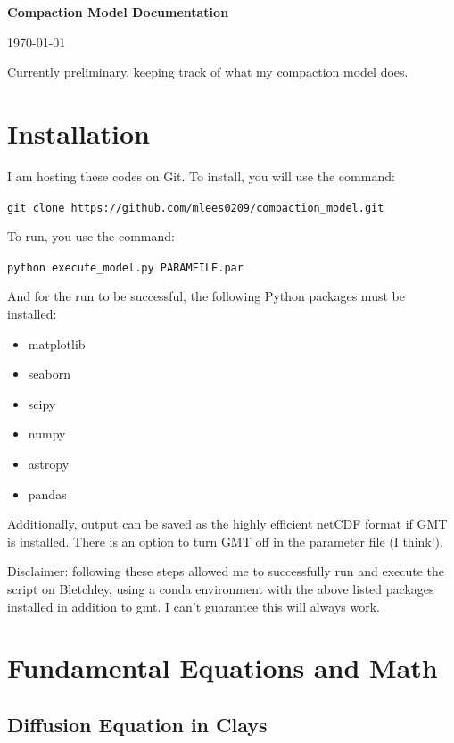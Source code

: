 \documentclass{article}
\begin{document}
\LARGE\textbf{Compaction Model Documentation}
\normalsize

\today
\author{Matt Lees}

\abstract Currently preliminary, keeping track of what my compaction model does.


\tableofcontents

\section{Installation}

I am hosting these codes on Git. To install, you will use the command:

\verb|git clone https://github.com/mlees0209/compaction_model.git|

To run, you use the command:

\verb|python execute_model.py PARAMFILE.par|

And for the run to be successful, the following Python packages must be installed:
\begin{itemize}
\item matplotlib
\item seaborn
\item scipy
\item numpy
\item astropy
\item pandas
\end{itemize}

Additionally, output can be saved as the highly efficient netCDF format if GMT is installed. There is an option to turn GMT off in the parameter file (I think!).

Disclaimer: following these steps allowed me to successfully run and execute the script on Bletchley, using a conda environment with the above listed packages installed in addition to gmt. I can't guarantee this will always work.

\section{Fundamental Equations and Math}

\subsection{Diffusion Equation in Clays}
\label{sec:diffusion}
\end{document}
